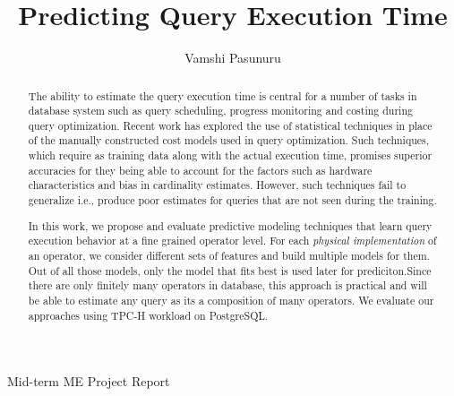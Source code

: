 \documentclass{article}
\title{\large \bf Predicting Query Execution Time }
\author{Vamshi Pasunuru}
\date{}
\begin{document}
	\maketitle
    \begin{center}
        Mid-term ME Project Report
    \end{center}
        \vskip 12pt
	\thispagestyle{empty}
	
	\begin{abstract}
	The ability to estimate the query execution time is central for a number of tasks in database system
	such as query scheduling, progress monitoring and costing during query optimization. Recent work 
	has explored the use of statistical techniques in place of the manually constructed cost models used 
	in query optimization. Such techniques, which require as training data along with the 
	actual execution time, promises superior accuracies for they being able to account for the factors 
	such as hardware characteristics and bias in cardinality estimates. However, such techniques fail 
	to generalize i.e., produce poor estimates for queries that are not seen during the training.
	
	In this work, we propose and evaluate predictive modeling techniques that learn query 
	execution behavior at a fine grained operator level. For each \textit{physical implementation} of an 			operator, we consider different sets of features and build multiple models for them. Out of all those 		models, only the model that fits best is used later for prediciton.Since there are only finitely many 		operators in database, this approach is practical and will be able to estimate any query as its a 			composition of many operators. We evaluate our approaches using TPC-H workload on PostgreSQL.

	\end{abstract}		
	\hfill 
\end{document}
